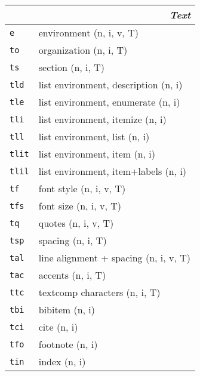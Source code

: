 \documentclass[oneside,10pt,landscape,DIV16]{scrartcl}
\newcommand{\Map}[1] {\textbf{\textasciiacute}\texttt{#1}}
\begin{document}
\begin{multicols}{3}
\begin{center}
\begin{tabular}[]{|p{11mm}|p{60mm}|}
\hline
\multicolumn{2}{|r|}{\textsl{\textbf{T}ext}}                 \\[1.0ex]
\hline \Map{e}    & environment                    \hfill (n, i, v, T)\\
\hline \Map{to}   & organization                   \hfill (n, i, T)\\
\hline \Map{ts}   & section                        \hfill (n, i, T)\\
\hline \Map{tld}  & list environment, description  \hfill (n, i)\\
\hline \Map{tle}  & list environment, enumerate    \hfill (n, i)\\
\hline \Map{tli}  & list environment, itemize      \hfill (n, i)\\
\hline \Map{tll}  & list environment, list         \hfill (n, i)\\
\hline \Map{tlit} & list environment, item         \hfill (n, i)\\
\hline \Map{tlil} & list environment, item+labels  \hfill (n, i)\\
\hline \Map{tf}   & font style                     \hfill (n, i, v, T)\\
\hline \Map{tfs}  & font size                      \hfill (n, i, v, T)\\
\hline \Map{tq}   & quotes                         \hfill (n, i, v, T)\\
\hline \Map{tsp}  & spacing                        \hfill (n, i, T)\\
\hline \Map{tal}  & line alignment + spacing       \hfill (n, i, v, T)\\
\hline \Map{tac}  & accents                        \hfill (n, i, T)\\
\hline \Map{ttc}  & textcomp characters            \hfill (n, i, T)\\
\hline
\hline \Map{tbi}  & bibitem                        \hfill (n, i)\\
\hline \Map{tci}  & cite                           \hfill (n, i)\\
\hline \Map{tfo}  & footnote                       \hfill (n, i)\\
\hline \Map{tin}  & index                          \hfill (n, i)\\

\end{tabular}
\end{center}
\end{multicols}
\end{document}

